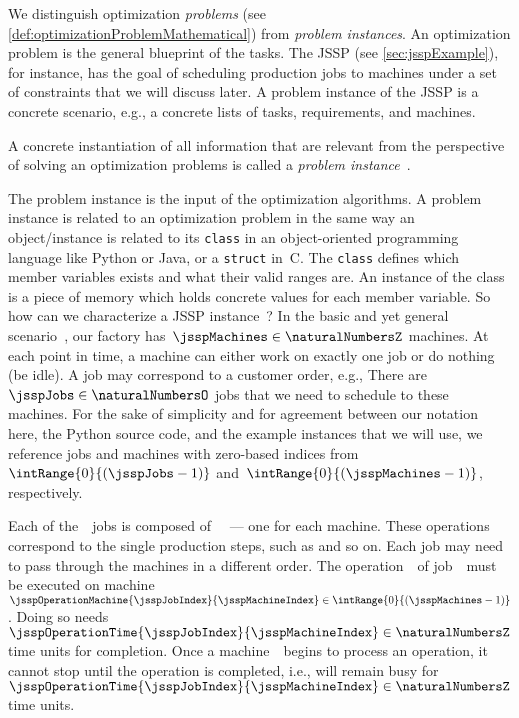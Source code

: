 %
\label{sec:problemInstance}%
%
%
%
We distinguish optimization \emph{problems} (see \autoref{def:optimizationProblemMathematical}) from \emph{problem instances}.
An optimization problem is the general blueprint of the tasks.
The JSSP (see \autoref{sec:jsspExample}), for instance, has the goal of scheduling production jobs to machines under a set of constraints that we will discuss later.
A problem instance of the JSSP is a concrete scenario, e.g., a concrete lists of tasks, requirements, and machines.%
%
\begin{definition}%
\label{def:instance}%
A concrete instantiation of all information that are relevant from the perspective of solving an optimization problems is called a \emph{problem instance}~\instance.%
\end{definition}%
%
The problem instance is the input of the optimization algorithms.
A problem instance is related to an optimization problem in the same way an object/instance is related to its \texttt{class} in an object-oriented programming language like Python or Java, or a \texttt{struct} in~C.
The \texttt{class} defines which member variables exists and what their valid ranges are.
An instance of the class is a piece of memory which holds concrete values for each member variable.%
%
\endhsection%
%
%
\label{sec:jsspInstance}%
%
%
%
So how can we characterize a JSSP instance~\instance?
In the basic and yet general scenario~\cite{GLLRK1979OAAIDSASAS,LLRKS1993SASAAC,L1982RRITTOMS,T1993BFBSP}, our factory has~$\jsspMachines\in\naturalNumbersZ$ machines.
At each point in time, a machine can either work on exactly one job or do nothing (be idle).
A job may correspond to a customer order, e.g., 
There are~$\jsspJobs\in\naturalNumbersO$ jobs that we need to schedule to these machines.
For the sake of simplicity and for agreement between our notation here, the Python source code, and the example instances that we will use, we reference jobs and machines with zero-based indices from~$\intRange{0}{(\jsspJobs-1)}$ and~$\intRange{0}{(\jsspMachines-1)}$, respectively.

Each of the~\jsspJobs\ jobs is composed of~\jsspMachines\  --- one for each machine.
These operations correspond to the single production steps, such as   and so on.
Each job may need to pass through the machines in a different order.
The operation~\jsspMachineIndex\ of job~\jsspJobIndex\ must be executed on machine~$\jsspOperationMachine{\jsspJobIndex}{\jsspMachineIndex}\in \intRange{0}{(\jsspMachines-1)}$.
Doing so needs~$\jsspOperationTime{\jsspJobIndex}{\jsspMachineIndex}\in\naturalNumbersZ$ time units for completion.
Once a machine~\jsspMachineIndex\ begins to process an operation, it cannot stop until the operation is completed, i.e., will remain busy for~$\jsspOperationTime{\jsspJobIndex}{\jsspMachineIndex}\in\naturalNumbersZ$ time units.

